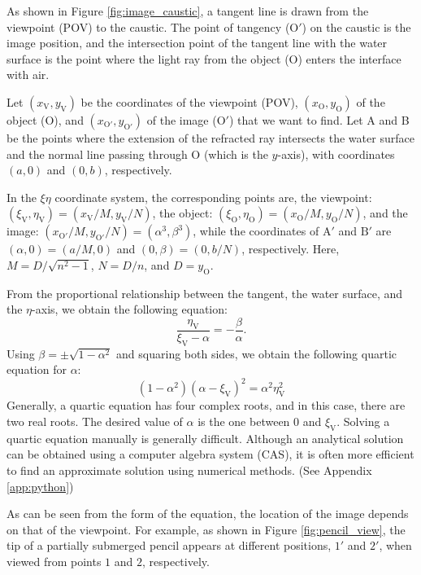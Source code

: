 \documentclass[twocolumn]{article}
\begin{document}
As shown in Figure \ref{fig:image_caustic}, a tangent line is drawn from the viewpoint (POV) to the caustic. The point of tangency ($\mathrm{O'}$) on the caustic is the image position, and the intersection point of the tangent line with the water surface is the point where the light ray from the object ($\mathrm{O}$) enters the interface with air.

Let $(x_{\mathrm{V}}, y_{\mathrm{V}})$ be the coordinates of the viewpoint (POV), $(x_{\mathrm{O}}, y_{\mathrm{O}})$ of the object ($\mathrm{O}$), and $(x_{\mathrm{O'}}, y_{\mathrm{O'}})$ of the image ($\mathrm{O'}$) that we want to find. Let A and B be the points where the extension of the refracted ray intersects the water surface and the normal line passing through O (which is the $y$-axis), with coordinates $(a, 0)$ and $(0, b)$, respectively. 

In the $\xi\eta$ coordinate system, the corresponding points are, the viewpoint: $(\xi_{\mathrm{V}}, \eta_{\mathrm{V}})=(x_{\mathrm{V}}/M, y_{\mathrm{V}}/N)$, the object: $(\xi_{\mathrm{O}}, \eta_{\mathrm{O}})=(x_{\mathrm{O}}/M, y_{\mathrm{O}}/N)$, and the image: $(x_{\mathrm{O'}}/M, y_{\mathrm{O'}}/N)=(\alpha^3, \beta^3)$, while the coordinates of $\mathrm{A'}$ and $\mathrm{B'}$ are $(\alpha, 0)=(a/M, 0)$ and $(0, \beta)=(0, b/N)$, respectively. Here, $M=D/\sqrt{n^2-1}$, $N=D/n$, and $D=y_{\mathrm{O}}$. 

From the proportional relationship between the tangent, the water surface, and the $\eta$-axis, we obtain the following equation:
$$\dfrac{\eta_{\mathrm{V}}}{\xi_{\mathrm{V}}-\alpha}=-\dfrac{\beta}{\alpha}.$$
Using $\beta = \pm \sqrt{1-\alpha^2}$ and squaring both sides, we obtain the following quartic equation for $\alpha$:
\[
\left( 1 - \alpha^2 \right) \left(\alpha-\xi_{\mathrm{V}} \right)^2 = \alpha^2 \eta_{\mathrm{V}}^2
\]
Generally, a quartic equation has four complex roots, and in this case, there are two real roots. The desired value of $\alpha$ is the one between 0 and $\xi_{\mathrm{V}}$. Solving a quartic equation manually is generally difficult. Although an analytical solution can be obtained using a computer algebra system (CAS), it is often more efficient to find an approximate solution using numerical methods. (See Appendix \ref{app:python})

As can be seen from the form of the equation, the location of the image depends on that of the viewpoint. For example, as shown in Figure \ref{fig:pencil_view}, the tip of a partially submerged pencil appears at different positions, $1'$ and $2'$, when viewed from points $1$ and $2$, respectively.
\end{document}
